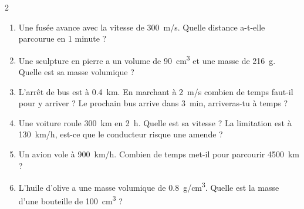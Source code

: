 \documentclass[11pt,a5paper,landscape]{article}
\begin{document}
\begin{multicols*}{2}
\begin{enumerate}[label=\alph*)]
    \item Une fusée avance avec la vitesse de \SI{300}{\meter/\second}. Quelle distance a-t-elle parcourue en 1 minute ?
    \item Une sculpture en pierre a un volume de \SI{90}{\centi\meter\cubed} et une masse de \SI{216}{\gram}. Quelle est sa masse volumique ?
    \item L’arrêt de bus est à \SI{0,4}{\kilo\meter}. En marchant à \SI{2}{\meter/\second} combien de temps faut-il pour y arriver ? Le prochain bus arrive dans \SI{3}{\minute}, arriveras-tu à temps ?
    \item Une voiture roule \SI{300}{\kilo\meter} en \SI{2}{\hour}. Quelle est sa vitesse ? La limitation est à \SI{130}{\kilo\meter/\hour}, est-ce que le conducteur risque une amende ?
    \item Un avion vole à \SI{900}{\kilo\meter/\hour}. Combien de temps met-il pour parcourir \SI{4500}{\kilo\meter} ?
    \item L'huile d'olive a une masse volumique de \SI{0,8}{\gram/\centi\meter\cubed}. Quelle est la masse d'une bouteille de \SI{100}{\centi\meter^3} ?
\end{enumerate}

\end{multicols*}
\end{document}
